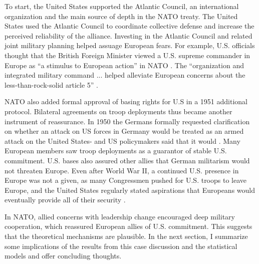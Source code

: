 \documentclass[12pt]{article}
\begin{document}
To start, the United States supported the Atlantic Council, an international organization and the main source of depth in the NATO treaty. 
The United States used the Atlantic Council to coordinate collective defense and increase the perceived reliability of the alliance. 
Investing in the Atlantic Council and related joint military planning helped assuage European fears. 
For example, U.S. officials thought that the British Foreign Minister viewed a U.S. supreme commander in Europe as ``a stimulus to European action'' in NATO \citep{Acheson1950}. 
The ``organization and integrated military command ... helped alleviate European concerns about the less-than-rock-solid article 5'' \citep[pg. 26]{Sayle2019}.


NATO also added formal approval of basing rights for U.S in a 1951 additional protocol.  
Bilateral agreements on troop deployments thus became another instrument of reassurance. 
In 1950 the Germans formally requested clarification on whether an attack on US forces in Germany would be treated as an armed attack on the United States- and US policymakers said that it would \citep[pg. 395]{Acheson1969}.  
Many European members saw troop deployments as a guarantor of stable U.S. commitment. 
U.S. bases also assured other allies that German militarism would not threaten Europe. 
Even after World War II, a continued U.S. presence in Europe was not a given, as many Congressmen pushed for U.S. troops to leave Europe, and the United States regularly stated aspirations that Europeans would eventually provide all of their security \citep[pg. 20]{Sayle2019}. 



In NATO, allied concerns with leadership change encouraged deep military cooperation, which reassured European allies of U.S. commitment. 
This suggests that the theoretical mechanisms are plausible. 
In the next section, I summarize some implications of the results from this case discussion and the statistical models and offer concluding thoughts. 
\end{document}
